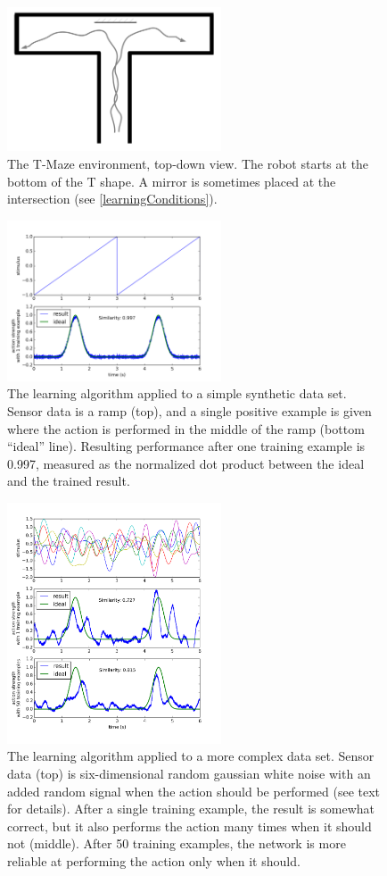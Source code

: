 \documentclass{frontiersSCNS}
\begin{document}
\begin{figure}[h!]
\centering
\includegraphics[width=2.5in]{../figures/tmazeRev.pdf}
\caption{The T-Maze environment, top-down view. The robot starts at the bottom of the T shape.
A mirror is sometimes placed at the intersection (see \ref{learningConditions}).}
\label{Tmaze}
\end{figure}

\begin{figure}[h!]
\centering
\includegraphics[width=2.5in]{../figures/sim_basic.png}
\caption{The learning algorithm applied to a simple synthetic data set.  Sensor
data is a ramp (top), and a single positive example is given where the
action is performed in the middle of the ramp (bottom ``ideal'' line).  Resulting
performance after one training example is 0.997, measured as the normalized
dot product between the ideal and the trained result.}
\label{SimBasic}
\end{figure}

\begin{figure}[h!]
\centering
\includegraphics[width=2.5in]{../figures/sim_advanced.png}
\caption{The learning algorithm applied to a more complex data set.  Sensor
    data (top) is six-dimensional random gaussian white noise with an added random
signal when the action should be performed (see text for details).  After 
a single training example, the result is somewhat correct, but it also performs
the action many times when it should not (middle).  After 50 training examples,
the network is more reliable at performing the action only when it should.}
\label{SimAdvanced}
\end{figure}
\end{document}
